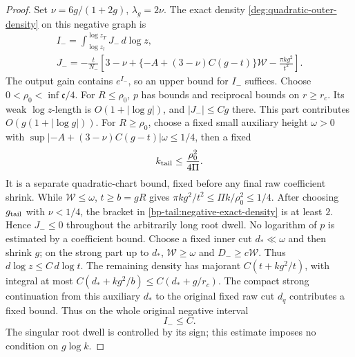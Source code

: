 \begin{proof}
Set \(\nu=6g/(1+2g)\), \(\lambda_g=2\nu\). The exact density
\eqref{deg:quadratic-outer-density} on this negative graph is
\begin{equation}\label{bp-tail:negative-exact-density}
 \begin{gathered}
 I_- =\int_{\log z_l}^{\log z_T}J_-\,d\log z,\\
 J_-=-\frac{t}{N_-}
 \left[3-\nu+\{-A+(3-\nu)C(g-t)\}\mathcal W
                                      -\frac{\pi kg^2}{t^2}\right].
 \end{gathered}
\end{equation}
The output gain contains \(e^{I_-}\), so an upper bound for
\(I_-\) suffices. Choose \(0<\rho_0<\inf\mathfrak c/4\).
For \(R\le\rho_0\), \(p\) has bounds and reciprocal bounds on
\(r\ge r_c\). Its weak \(\log z\)-length is \(O(1+|\log g|)\),
and \(|J_-|\le Cg\) there. This part contributes \(O(g(1+|\log g|))\).
For \(R\ge\rho_0\), choose a fixed small auxiliary height
\(\omega>0\) with
\(\sup|{-A+(3-\nu)C(g-t)}|\omega\le1/4\), then a fixed
\[
             k_{\rm tail}\le\frac{\rho_0^2}{4\Pi}.
\]
It is a separate quadratic-chart bound, fixed before any final raw
coefficient shrink. While \(\mathcal W\le\omega\),
\(t\ge b=gR\) gives \(\pi kg^2/t^2\le\Pi k/\rho_0^2\le1/4\).
After choosing \(g_{\rm tail}\) with \(\nu<1/4\), the bracket
in \eqref{bp-tail:negative-exact-density} is at least \(2\).
Hence \(J_-\le0\) throughout the arbitrarily long root dwell.
No logarithm of \(p\) is estimated by a coefficient bound.
Choose a fixed inner cut \(d_*\ll\omega\) and then shrink \(g\);
on the strong part up to \(d_*\), \(\mathcal W\ge\omega\) and
\(D_-\ge c\mathcal W\). Thus \(d\log z\le C\,d\log t\).
The remaining density
has majorant \(C(t+kg^2/t)\), with integral at most
\(C(d_*+kg^2/b)\le C(d_*+g/r_c)\).
The compact strong continuation from this auxiliary \(d_*\) to the
original fixed raw cut \(d_q\) contributes a fixed bound. Thus on the whole original
negative interval
\begin{equation}\label{bp-tail:negative-density-value}
                              I_-\le C.
\end{equation}
The singular root dwell is controlled by its sign; this estimate imposes
no condition on \(g\log k\).


\end{proof}
